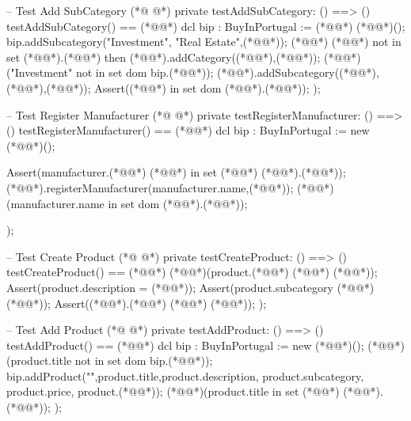 \begin{vdmpp}[breaklines=true]
 -- Test Add SubCategory
(*@
\label{testAddSubCategory:141}
@*)
 private testAddSubCategory: () ==> ()
 testAddSubCategory() == (*@\vdmnotcovered{(}@*)
  dcl bip : BuyInPortugal := (*@@*) (*@@*)();
  bip.addSubcategory("Investment", "Real Estate",(*@@*));
  (*@@*) (*@@*) not in set (*@@*).(*@@*) then
    (*@@*).addCategory((*@@*),(*@@*));
  (*@@*)("Investment" not in set dom bip.(*@@*));
  (*@@*).addSubcategory((*@@*), (*@@*),(*@@*));
   Assert((*@@*) in set dom (*@@*).(*@@*));
 );
 
 -- Test Register Manufacturer
(*@
\label{testRegisterManufacturer:153}
@*)
 private testRegisterManufacturer: () ==> ()
 testRegisterManufacturer() == (*@\vdmnotcovered{(}@*)
  dcl bip : BuyInPortugal := new (*@@*)();
  
  Assert(manufacturer.(*@@*) (*@@*) in set (*@@*) (*@@*).(*@@*));
  (*@@*).registerManufacturer(manufacturer.name,(*@@*));
  (*@@*)(manufacturer.name in set dom (*@@*).(*@@*));
   
 );
 
 -- Test Create Product
(*@
\label{testCreateProduct:164}
@*)
 private testCreateProduct: () ==> ()
 testCreateProduct() == (*@\vdmnotcovered{(}@*)
   (*@@*)(product.(*@@*) (*@\vdmnotcovered{=}@*) (*@@*));
   Assert(product.description = (*@@*));
   Assert(product.subcategory (*@\vdmnotcovered{=}@*) (*@@*));
   Assert((*@@*).(*@@*) (*@\vdmnotcovered{=}@*) (*@@*));
 );
 
 -- Test Add Product
(*@
\label{testAddProduct:173}
@*)
 private testAddProduct: () ==> ()
 testAddProduct() == (*@\vdmnotcovered{(}@*)
  dcl bip : BuyInPortugal := new (*@@*)();
  (*@@*)(product.title not in set dom bip.(*@@*));
  bip.addProduct("",product.title,product.description, product.subcategory, product.price, product.(*@@*));
   (*@@*)(product.title in set (*@@*) (*@@*).(*@@*));
 );
 

\end{vdmpp}
